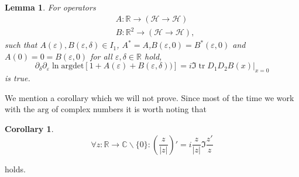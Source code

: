 \documentclass[oneside,reqno,12pt]{amsart}
\newtheorem{lemma}{Lemma}
\newtheorem{Corollary}[Def]{Corollary}
\DeclareMathOperator{\tr}{tr}
\begin{document}
\begin{lemma}\label{lemma:Aux}
For operators 
\begin{align*}
&A: \mathbb{R}\rightarrow \left( \mathcal{H}\rightarrow\mathcal{H}\right)\\
&B: \mathbb{R}^2 \rightarrow \left( \mathcal{H}\rightarrow\mathcal{H}\right),
\end{align*}
such that \(A(\varepsilon),B(\varepsilon,\delta)\in I_1\), \(A^*=A\),\(B(\varepsilon,0)=B^*(\varepsilon,0)\) and \(A(0)=0=B(\varepsilon,0)\) for all \(\varepsilon,\delta\in\mathbb{R}\) hold, 
\begin{equation}
\partial_\delta \partial_\varepsilon \ln \text{argdet}\left[ 1 + A(\varepsilon) + B(\varepsilon,\delta))\right] 
= i \Im \tr D_1 D_2 B(x)|_{x=0}
\end{equation}
is true.
\end{lemma}
We mention a corollary which we will not prove.
Since most of the time we work with the \(\text{arg}\) of complex numbers it is worth noting that
\begin{Corollary}\label{corollary:phase'}
\begin{equation}
\forall z:\mathbb{R}\rightarrow \mathbb{C}\backslash \{0\}: \left( \frac{z}{|z|}\right)'=  i \frac{z}{|z|} \Im \frac{ z'}{z}
\end{equation}
\end{Corollary}
holds. 
\end{document}
